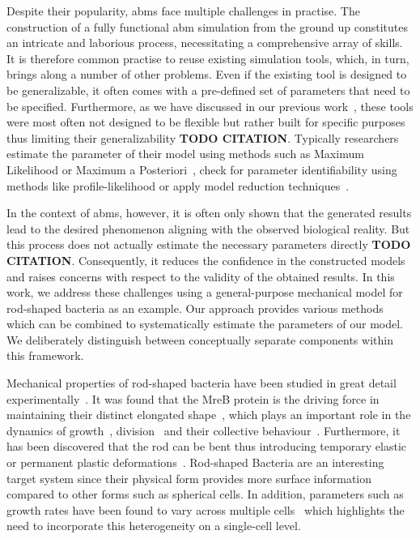 \documentclass[10pt,letterpaper]{article}
\begin{document}
Despite their popularity, \acp{abm} face multiple challenges in practise.
The construction of a fully functional \ac{abm} simulation from the ground up constitutes an
intricate and laborious process, necessitating a comprehensive array of skills. It is therefore
common practise to reuse existing simulation tools, which, in turn, brings along a number of
other problems.
Even if the existing tool is designed to be generalizable, it often comes with a pre-defined set
of parameters that need to be specified.
Furthermore, as we have discussed in our previous work~\cite{Pleyer2023}, these tools were most
often not designed to be flexible but rather built for specific purposes thus limiting their
generalizability \textbf{TODO CITATION}.
Typically researchers estimate the parameter of their model using methods such as Maximum Likelihood
or Maximum a Posteriori~\cite{Gbor2015,Banga2008,Ashyraliyev2009}, check for parameter
identifiability using methods like profile-likelihood or apply model reduction
techniques~\cite{Kreutz2013,Raue2014,Simpson2025}.

In the context of \acp{abm}, however, it is often only shown that the generated results lead to the
desired phenomenon aligning with the observed biological reality.
But this process does not actually estimate the necessary parameters directly \textbf{TODO CITATION}.
Consequently, it reduces the confidence in the constructed models and raises concerns with respect
to the validity of the obtained results.
In this work, we address these challenges using a general-purpose mechanical model for rod-shaped
bacteria as an example.
Our approach provides various methods which can be combined to systematically estimate the
parameters of our model. We deliberately distinguish between conceptually separate components within
this framework.

Mechanical properties of rod-shaped bacteria have been studied in great detail
experimentally~\cite{Chatterjee1988,Takeuchi2005,IWAI2002}.
It was found that the MreB protein is the driving force in maintaining their distinct elongated
shape~\cite{Ursell2014}, which plays an important role in the dynamics of
growth~\cite{Billaudeau2017}, division~\cite{Harry2001} and their collective
behaviour~\cite{vanGestel2015,Balagam2015}.
Furthermore, it has been discovered that the rod can be bent thus introducing temporary elastic or
permanent plastic deformations~\cite{Amir2014_2}.
Rod-shaped Bacteria are an interesting target system since their physical form provides more surface
information compared to other forms such as spherical cells.
In addition, parameters such as growth rates have been found to vary across multiple
cells~\cite{Koutsoumanis2013} which highlights the need to incorporate this heterogeneity on a
single-cell level.
\end{document}
